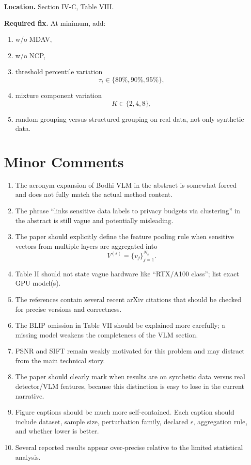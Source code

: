 \textbf{Location.}  
Section IV-C, Table VIII.

\textbf{Required fix.}  
At minimum, add:
\begin{enumerate}
\item w/o MDAV,
\item w/o NCP,
\item threshold percentile variation
\[
\tau_i \in \{80\%, 90\%, 95\%\},
\]
\item mixture component variation
\[
K \in \{2,4,8\},
\]
\item random grouping versus structured grouping on real data, not only synthetic data.
\end{enumerate}

\section*{Minor Comments}

\begin{enumerate}
\item The acronym expansion of Bodhi VLM in the abstract is somewhat forced and does not fully match the actual method content.
\item The phrase ``links sensitive data labels to privacy budgets via clustering'' in the abstract is still vague and potentially misleading.
\item The paper should explicitly define the feature pooling rule when sensitive vectors from multiple layers are aggregated into
\[
V^{(s)} = \{v_j\}_{j=1}^{N_s}.
\]
\item Table II should not state vague hardware like ``RTX/A100 class''; list exact GPU model(s).
\item The references contain several recent arXiv citations that should be checked for precise versions and correctness.
\item The BLIP omission in Table VII should be explained more carefully; a missing model weakens the completeness of the VLM section.
\item PSNR and SIFT remain weakly motivated for this problem and may distract from the main technical story.
\item The paper should clearly mark when results are on synthetic data versus real detector/VLM features, because this distinction is easy to lose in the current narrative.
\item Figure captions should be much more self-contained. Each caption should include dataset, sample size, perturbation family, declared $\epsilon$, aggregation rule, and whether lower is better.
\item Several reported results appear over-precise relative to the limited statistical analysis.
\end{enumerate}

